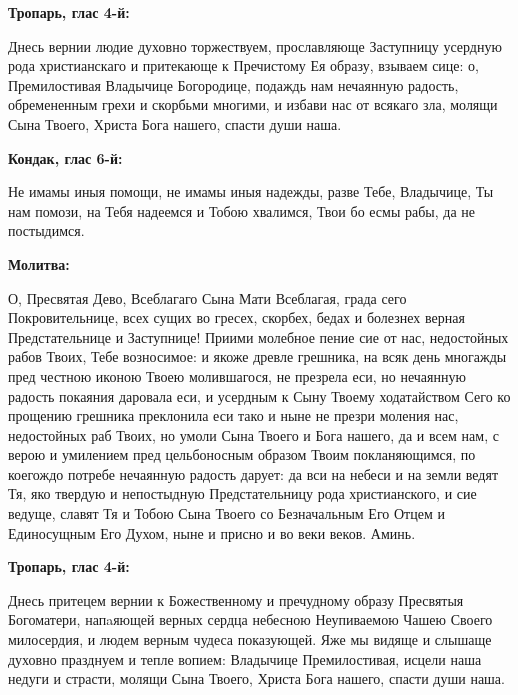  


\bfseries Тропарь, глас 4-й\normalfont{}:


Днесь вернии людие духовно торжествуем, прославляюще Заступницу усердную рода христианскаго и притекающе к Пречистому Ея образу, взываем сице: о, Премилостивая Владычице Богородице, подаждь нам нечаянную радость, обремененным грехи и скорбьми многими, и избави нас от всякаго зла, молящи Сына Твоего, Христа Бога нашего, спасти души наша.


\medskip


\bfseries Кондак, глас 6-й\normalfont{}:


Не имамы иныя помощи, не имамы иныя надежды, разве Тебе, Владычице, Ты нам помози, на Тебя надеемся и Тобою хвалимся, Твои бо есмы рабы, да не постыдимся.


\medskip


\bfseries Молитва\normalfont{}:


О, Пресвятая Дево, Всеблагаго Сына Мати Всеблагая, града сего Покровительнице, всех сущих во гресех, скорбех, бедах и болезнех верная Предстательнице и Заступнице! Приими молебное пение сие от нас, недостойных рабов Твоих, Тебе возносимое: и якоже древле грешника, на всяк день многажды пред честною иконою Твоею молившагося, не презрела еси, но нечаянную радость покаяния даровала еси, и усердным к Сыну Твоему ходатайством Сего ко прощению грешника преклонила еси тако и ныне не презри моления нас, недостойных раб Твоих, но умоли Сына Твоего и Бога нашего, да и всем нам, с верою и умилением пред цельбоносным образом Твоим покланяющимся, по коегождо потребе нечаянную радость дарует: да вси на небеси и на земли ведят Тя, яко твердую и непостыдную Предстательницу рода христианского, и сие ведуще, славят Тя и Тобою Сына Твоего со Безначальным Его Отцем и Единосущным Его Духом, ныне и присно и во веки веков. Аминь.
\nopagebreak\bigskip\bigskip\mychapterending

 
\vspace{-\baselineskip}

\bfseries Тропарь, глас 4-й:\normalfont{}\nopagebreak


Днесь притецем вернии к Божественному и пречудному образу Пресвятыя Богоматери, напaяющей верных сердца небесною Неупиваемою Чашею Своего милосердия, и людем верным чудеса показующей. Яже мы видяще и слышаще духовно празднуем и тепле вопием: Владычице Премилостивая, исцели наша недуги и страсти, молящи Сына Твоего, Христа Бога нашего, спасти души наша.


